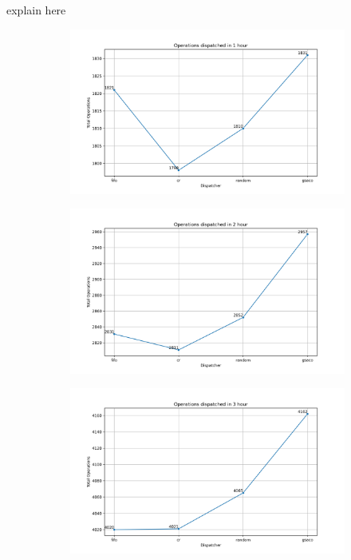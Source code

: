 explain here

\begin{figure}[t]
	\centering
	\begin{subfigure}{0.32\textwidth}
		\includegraphics[width=\textwidth]{HVLM/total_operations_3600s.png}
	\end{subfigure}\hfill
	\begin{subfigure}{0.32\textwidth}
		\includegraphics[width=\textwidth]{HVLM/total_operations_7200s.png}
	\end{subfigure}\hfill
	\begin{subfigure}{0.32\textwidth}
		\includegraphics[width=\textwidth]{HVLM/total_operations_10800s.png}

\end{subfigure}
\end{figure}
